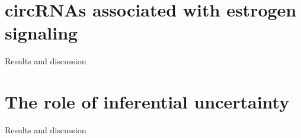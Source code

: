 \section{circRNAs associated with estrogen signaling}
Results and discussion

\lipsum[1-2]

\section{The role of inferential uncertainty}
Results and discussion

\lipsum[1-2]
